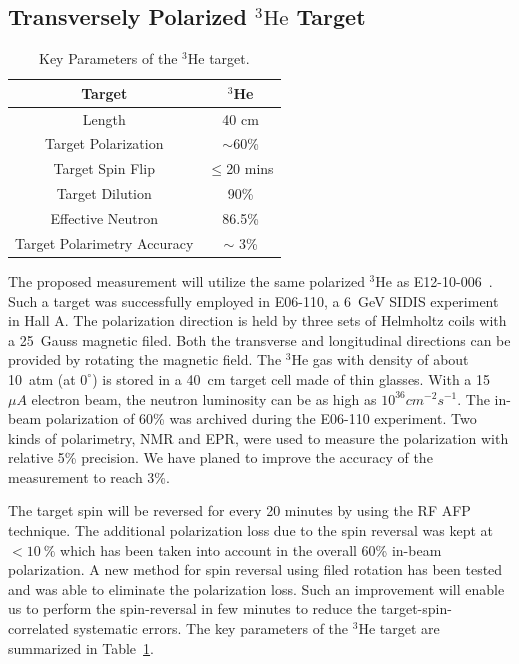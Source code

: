 \subsection {Transversely Polarized $\mathrm{^{3}He}$ Target}
\begin{table}[!ht]
\centering
\begin{tabular}{|c|c|}
\hline
Target                       & $^3$He              \\\hline 
Length                       & 40 cm               \\\hline          
Target Polarization          & $\sim$60\%          \\\hline 
Target Spin Flip             & $\leq$20 mins       \\\hline 
Target Dilution              & 90\%  \\\hline
Effective Neutron            & 86.5\%  \\\hline
Target Polarimetry Accuracy  & $\sim$ 3\%          \\\hline
\end{tabular}
\caption{\footnotesize{Key Parameters of the $\mathrm{^{3}He}$ target.}}\label{table:target}
\end{table} 
The proposed measurement will utilize the same polarized $\mathrm{^{3}He}$ as E12-10-006~\cite{e12-10-006}. Such a target was successfully employed in E06-110, a 6~GeV SIDIS experiment in Hall A. The polarization direction is held by three sets of Helmholtz coils with a 25~Gauss magnetic filed. Both the transverse and longitudinal directions can be provided by rotating the magnetic field. The $\mathrm{^{3}He}$ gas with density of about 10~atm (at $0^{\circ}$) is stored in a 40~cm target cell made of thin glasses. With a 15~$\mu A$ electron beam, the neutron luminosity can be as high as $10^{36} cm^{-2}s^{-1}$. The in-beam polarization of 60\% was archived during the E06-110 experiment. Two kinds of polarimetry, NMR and EPR, were used to measure the polarization with relative 5\% precision. We have planed to improve the accuracy of the measurement to reach 3\%.

The target spin will be reversed for every 20 minutes by using the RF AFP technique. The additional polarization loss due to the spin reversal was kept at $<10~\%$ which has been taken into account in the overall 60\% in-beam polarization. A new method for spin reversal using filed rotation has been tested and was able to eliminate the polarization loss. Such an improvement will enable us to perform the spin-reversal in few minutes to reduce the target-spin-correlated systematic errors. The key parameters of the $\mathrm{^{3}He}$ target are summarized in Table~\ref{table:target}.
  
